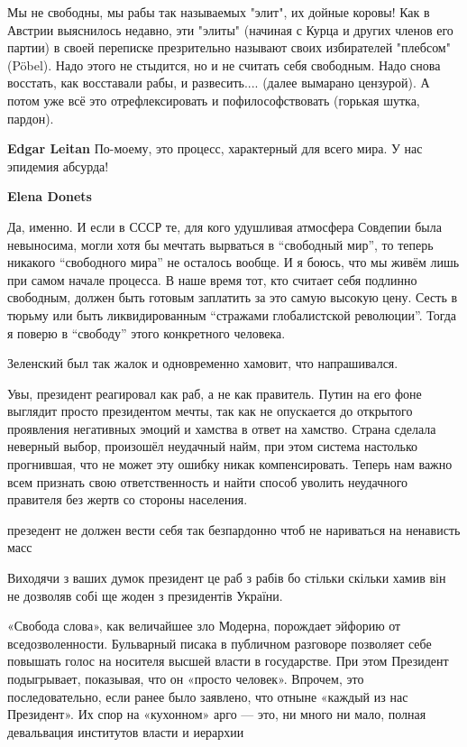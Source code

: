 \begin{itemize}
\begin{itemize}
Мы не свободны, мы рабы так называемых "элит", их дойные коровы! Как в Австрии
выяснилось недавно, эти "элиты" (начиная с Курца и других членов его партии) в
своей переписке презрительно называют своих избирателей "плебсом" (Pöbel). Надо
этого не стыдится, но и не считать себя свободным. Надо снова восстать, как
восставали рабы, и развесить.... (далее вымарано цензурой). А потом уже всё это
отрефлексировать и пофилософствовать (горькая шутка, пардон).


\textbf{Edgar Leitan} По-моему, это процесс, характерный для всего мира. У нас эпидемия абсурда!

\textbf{Elena Donets} 

Да, именно. И если в СССР те, для кого удушливая атмосфера Совдепии была
невыносима, могли хотя бы мечтать вырваться в \enquote{свободный мир}, то теперь
никакого \enquote{свободного мира} не осталось вообще. И я боюсь, что мы живём лишь при
самом начале процесса. В наше время тот, кто считает себя подлинно свободным,
должен быть готовым заплатить за это самую высокую цену. Сесть в тюрьму или
быть ликвидированным \enquote{стражами глобалистской революции}. Тогда я поверю в
\enquote{свободу} этого конкретного человека.

\end{itemize} %

Зеленский был так жалок и одновременно хамовит, что напрашивался.


Увы, президент реагировал как раб, а не как правитель. Путин на его фоне
выглядит просто президентом мечты, так как не опускается до открытого
проявления негативных эмоций и хамства в ответ на хамство. Страна сделала
неверный выбор, произошёл неудачный найм, при этом система настолько
прогнившая, что не может эту ошибку никак компенсировать. Теперь нам важно всем
признать свою ответственность и найти способ уволить неудачного правителя без
жертв со стороны населения.

презедент не должен вести себя так безпардонно чтоб не нариваться на ненависть масс


Виходячи з ваших думок президент це раб з рабів бо стільки скільки хамив він не
дозволяв собі ще жоден з президентів України.


«Свобода слова», как величайшее зло Модерна, порождает эйфорию от
вседозволенности. Бульварный писака в публичном разговоре позволяет себе
повышать голос на носителя высшей власти в государстве. При этом Президент
подыгрывает, показывая, что он «просто человек». Впрочем, это последовательно,
если ранее было заявлено, что отныне «каждый из нас Президент». Их спор на
«кухонном» арго — это, ни много ни мало, полная девальвация институтов власти и
иерархии


\end{itemize}
